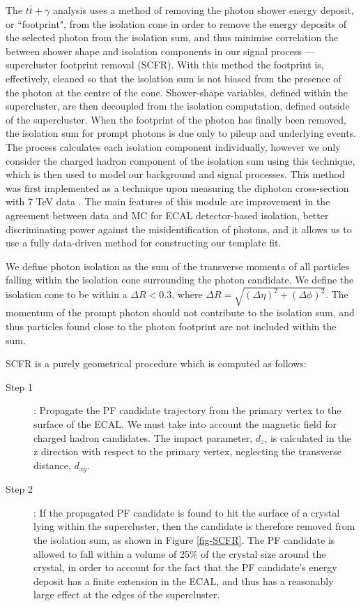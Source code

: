 The $t\bar{t}+\gamma$ analysis uses a method of removing the photon shower energy deposit, or ``footprint", from the isolation cone in order to remove the energy deposits of the selected photon from the isolation sum, and thus minimise correlation the between shower shape and isolation components in our signal process --- supercluster footprint removal (SCFR). With this method the footprint is, effectively, cleaned so that the isolation sum is not biased from the presence of the photon at the centre of the cone. Shower-shape variables, defined within the supercluster, are then decoupled from the isolation computation, defined outside of the supercluster. When the footprint of the photon has finally been removed, the isolation sum for prompt photons is due only to pileup and underlying events. The process calculates each isolation component individually, however we only consider the charged hadron component of the isolation sum using this technique, which is then used to model our background and signal processes. This method was first implemented as a technique upon measuring the diphoton cross-section with 7 TeV data \cite{diffxsectdiphoton}. The main features of this module are improvement in the agreement between data and MC for ECAL detector-based isolation, better discriminating power against the misidentification of photons, and it allows us to use a fully data-driven method for constructing our template fit.

We define photon isolation as the sum of the transverse momenta of all particles falling within the isolation cone surrounding the photon candidate. We define the isolation cone to be within a $\Delta R < 0.3$, where $\Delta R = \sqrt{(\Delta\eta)^2+(\Delta\phi)^2}$. The momentum of the prompt photon should not contribute to the isolation sum, and thus particles found close to the photon footprint are not included within the sum. 

SCFR is a purely geometrical procedure which is computed as follows:

\begin{description}
	\item[Step 1]: Propagate the PF candidate trajectory from the primary vertex to the surface of the ECAL. We must take into account the magnetic field for charged hadron candidates. The impact parameter, $d_z$, is calculated in the z direction with respect to the primary vertex, neglecting the transverse distance, $d_{xy}$. 
	\item[Step 2]: If the propagated PF candidate is found to hit the surface of a crystal lying within the supercluster, then the candidate is therefore removed from the isolation sum, as shown in Figure \ref{fig-SCFR}. The PF candidate is allowed to fall within a volume of 25\% of the crystal size around the crystal, in order to account for the fact that the PF candidate's energy deposit has a finite extension in the ECAL, and thus has a reasonably large effect at the edges of the supercluster. 
\end{description}

